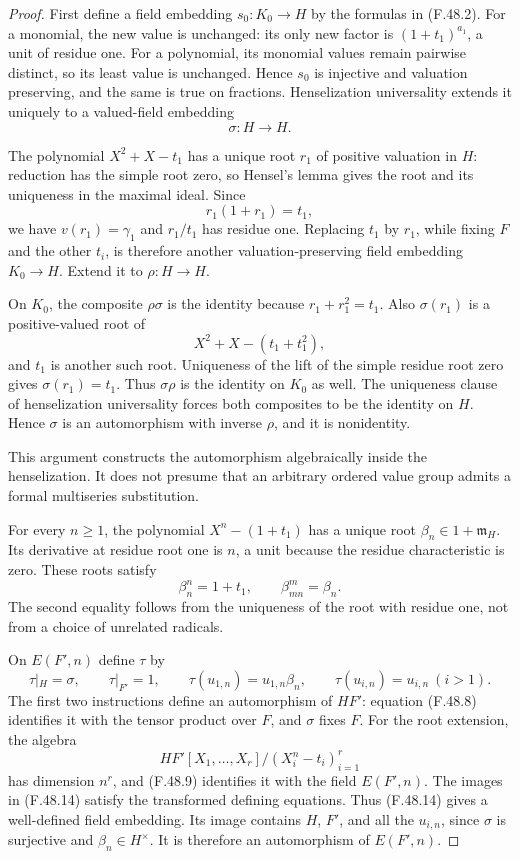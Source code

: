 \begin{proof}
First define a field embedding \(s_0:K_0\to H\) by the formulas in (F.48.2). For a monomial, the new value is unchanged: its only new factor is \((1+t_1)^{a_1}\), a unit of residue one. For a polynomial, its monomial values remain pairwise distinct, so its least value is unchanged. Hence \(s_0\) is injective and valuation preserving, and the same is true on fractions. Henselization universality extends it uniquely to a valued-field embedding
\[
                                \sigma:H\longrightarrow H.
\]

The polynomial \(X^2+X-t_1\) has a unique root \(r_1\) of positive valuation in \(H\): reduction has the simple root zero, so Hensel's lemma gives the root and its uniqueness in the maximal ideal. Since
\[
                  r_1(1+r_1)=t_1,
\]
we have \(v(r_1)=\gamma_1\) and \(r_1/t_1\) has residue one. Replacing \(t_1\) by \(r_1\), while fixing \(F\) and the other \(t_i\), is therefore another valuation-preserving field embedding \(K_0\to H\). Extend it to \(\rho:H\to H\).

On \(K_0\), the composite \(\rho\sigma\) is the identity because \(r_1+r_1^2=t_1\). Also \(\sigma(r_1)\) is a positive-valued root of
\[
                     X^2+X-(t_1+t_1^2),
\]
and \(t_1\) is another such root. Uniqueness of the lift of the simple residue root zero gives \(\sigma(r_1)=t_1\). Thus \(\sigma\rho\) is the identity on \(K_0\) as well. The uniqueness clause of henselization universality forces both composites to be the identity on \(H\). Hence \(\sigma\) is an automorphism with inverse \(\rho\), and it is nonidentity.

This argument constructs the automorphism algebraically inside the henselization. It does not presume that an arbitrary ordered value group admits a formal multiseries substitution.

For every \(n\geq1\), the polynomial \(X^n-(1+t_1)\) has a unique root \(\beta_n\in1+\mathfrak m_H\). Its derivative at residue root one is \(n\), a unit because the residue characteristic is zero. These roots satisfy
\[
                 \beta_n^n=1+t_1,\qquad
                 \beta_{mn}^{m}=\beta_n.
 \tag{F.48.13}
\]
The second equality follows from the uniqueness of the root with residue one, not from a choice of unrelated radicals.

On \(E(F',n)\) define \(\tau\) by
\[
 \tau|_H=\sigma,\qquad \tau|_{F'}=1,\qquad
 \tau(u_{1,n})=u_{1,n}\beta_n,\qquad
 \tau(u_{i,n})=u_{i,n}\ (i>1).
 \tag{F.48.14}
\]
The first two instructions define an automorphism of \(HF'\): equation (F.48.8) identifies it with the tensor product over \(F\), and \(\sigma\) fixes \(F\). For the root extension, the algebra
\[
 HF'[X_1,\ldots,X_r]/(X_i^n-t_i)_{i=1}^r
\]
has dimension \(n^r\), and (F.48.9) identifies it with the field \(E(F',n)\). The images in (F.48.14) satisfy the transformed defining equations. Thus (F.48.14) gives a well-defined field embedding. Its image contains \(H\), \(F'\), and all the \(u_{i,n}\), since \(\sigma\) is surjective and \(\beta_n\in H^\times\). It is therefore an automorphism of \(E(F',n)\).


\end{proof}
